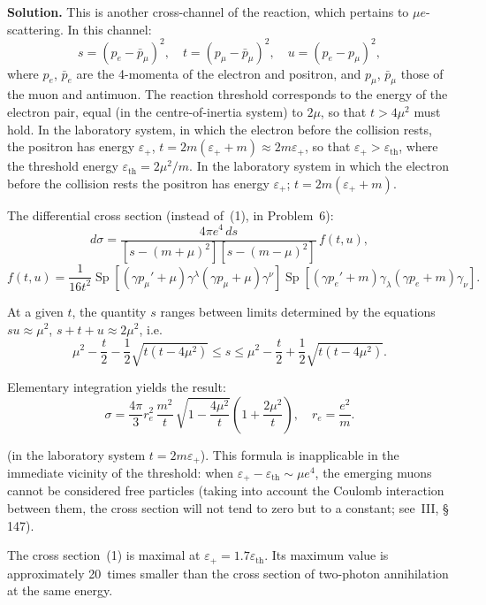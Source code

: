 \textbf{Solution.} This is another cross-channel of the reaction, which pertains to $\mu e$-scattering. In this channel:
\[
s = (p_e - \bar{p}_\mu)^2,\quad t = (p_\mu - \bar{p}_\mu)^2,\quad u = (p_e - p_\mu)^2,
\]
where $p_e$, $\bar{p}_e$ are the 4-momenta of the electron and positron, and $p_\mu$, $\bar{p}_\mu$ those of the muon and antimuon. The reaction threshold corresponds to the energy of the electron pair, equal (in the centre-of-inertia system) to $2\mu$, so that $t > 4\mu^2$ must hold. In the laboratory system, in which the electron before the collision rests, the positron has energy $\varepsilon_+$, $t = 2m(\varepsilon_+ + m) \approx 2m\varepsilon_+$, so that $\varepsilon_+ > \varepsilon_\text{th}$, where the threshold energy $\varepsilon_\text{th} = 2\mu^2/m$. In the laboratory system in which the electron before the collision rests the positron has energy $\varepsilon_+$; $t = 2m(\varepsilon_+ + m)$.

The differential cross section (instead of~(1), in Problem~6):
\[
d\sigma = \frac{4\pi e^4\,ds}{[s-(m+\mu)^2][s-(m-\mu)^2]}\,f(t,u),\tag{1}
\]
\[
f(t,u) = \frac{1}{16t^2}\operatorname{Sp}[(\gamma p_\mu'+\mu)\gamma^\lambda(\gamma p_\mu+\mu)\gamma^\nu]\operatorname{Sp}[(\gamma p_e'+m)\gamma_\lambda(\gamma p_e+m)\gamma_\nu].
\]

At a given $t$, the quantity $s$ ranges between limits determined by the equations $su \approx \mu^2$, $s + t + u \approx 2\mu^2$, i.e.
\[
\mu^2 - \frac{t}{2} - \frac{1}{2}\sqrt{t(t - 4\mu^2)} \leqslant s \leqslant \mu^2 - \frac{t}{2} + \frac{1}{2}\sqrt{t(t - 4\mu^2)}.
\]

Elementary integration yields the result:
\begin{equation}
\sigma = \frac{4\pi}{3}r_e^2\,\frac{m^2}{t}\,\sqrt{1-\frac{4\mu^2}{t}}\left(1+\frac{2\mu^2}{t}\right),\quad r_e = \frac{e^2}{m}.
\tag{1}
\end{equation}

(in the laboratory system $t = 2m\varepsilon_+$). This formula is inapplicable in the immediate vicinity of the threshold: when $\varepsilon_+ - \varepsilon_\text{th} \sim \mu e^4$, the emerging muons cannot be considered free particles (taking into account the Coulomb interaction between them, the cross section will not tend to zero but to a constant; see~III, \S\,147).

The cross section~(1) is maximal at $\varepsilon_+ = 1.7\varepsilon_\text{th}$. Its maximum value is approximately 20~times smaller than the cross section of two-photon annihilation at the same energy.
